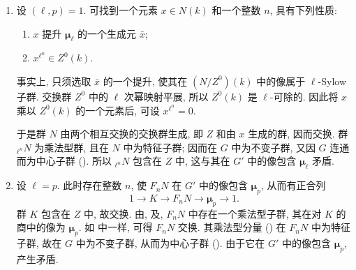 \begin{enumerate}
\item[(i)] 
设 \((\ell,p)=1\). 可找到一个元素 \(x\in N(k)\) 和一个整数 \(n\), 具有下列性质:
  \begin{enumerate}
  \item[(a)] 
\(x\) 提升 \(\boldsymbol\mu_\ell\) 的一个生成元 \(\bar x\);
  \item[(b)] 
\(x^{\ell^n}\in Z^0(k)\).
  \end{enumerate}
事实上, 只须选取 \(\bar x\) 的一个提升,
使其在 \((N/Z^0)(k)\) 中的像属于 \(\ell\)-Sylow 子群.
交换群 \(Z^0\) 中的 \(\ell\) 次幂映射平展, 所以 \(Z^0(k)\) 是 \(\ell\)-可除的.
因此将 \(x\) 乘以 \(Z^0(k)\) 的一个元素后, 可设 \(x^{\ell^n}=0\).

于是群 \(N\) 由两个相互交换的交换群生成, 即 \(Z\) 和由 \(x\) 生成的群,
因而交换. 群 \({}_{\ell^n}N\) 为乘法型群,
且在 \(N\) 中为特征子群; 因而在 \(G\) 中为不变子群,
又因 \(G\) 连通而为中心子群 ().
所以 \({}_{\ell^n}N\) 包含在 \(Z\) 中,
这与其在 \(G'\) 中的像包含 \(\boldsymbol\mu_\ell\) 矛盾.

\item[(ii)] 
设 \(\ell=p\). 此时存在整数 \(n\), 使 \(F_nN\) 在 \(G'\) 中的像包含 \(\boldsymbol\mu_p\),
从而有正合列
  \[
    1\longrightarrow K\longrightarrow F_nN
      \longrightarrow\boldsymbol\mu_p\longrightarrow1. \tag{*}\label{sga3:xvii:lemma:7-3-2:equation:star}
  \]
群 \(K\) 包含在 \(Z\) 中, 故交换.
由,
及,
\(F_nN\) 中存在一个乘法型子群, 其在对 \(K\) 的商中的像为 \(\boldsymbol\mu_p\).
如 中一样, 可得 \(F_nN\) 交换.
其乘法型分量 () 在 \(F_nN\) 中为特征子群,
故在 \(G\) 中为不变子群, 从而为中心子群
().
由于它在 \(G'\) 中的像包含 \(\boldsymbol\mu_p\), 产生矛盾.
\end{enumerate}



